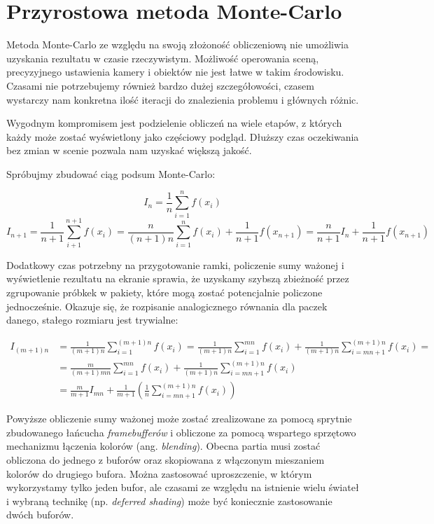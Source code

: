 \documentclass[../main.tex]{subfiles}
\begin{document}
\section{Przyrostowa metoda Monte-Carlo}

Metoda Monte-Carlo ze względu na swoją złożoność obliczeniową nie umożliwia
uzyskania rezultatu w czasie rzeczywistym. Możliwość operowania sceną,
precyzyjnego ustawienia kamery i obiektów nie jest łatwe w takim środowisku.
Czasami nie potrzebujemy również bardzo dużej szczegółowości, czasem wystarczy
nam konkretna ilość iteracji do znalezienia problemu i głównych różnic.

Wygodnym kompromisem jest podzielenie obliczeń na wiele etapów, z których każdy
może zostać wyświetlony jako częściowy podgląd. Dłuższy czas oczekiwania bez
zmian w scenie pozwala nam uzyskać większą jakość.

Spróbujmy zbudować ciąg podsum Monte-Carlo:

\[ I_n = \frac{1}{n} \sum_{i=1}^{n} f(x_i) \]
\[
  I_{n+1} = \frac{1}{n+1} \sum_{i+1}^{n+1}f(x_i)
    = \frac{n}{(n+1)n} \sum_{i=1}^{n}f(x_i) + \frac{1}{n+1}f(x_{n+1})
    = \frac{n}{n+1} I_{n} + \frac{1}{n+1}f(x_{n+1})
\]

Dodatkowy czas potrzebny na przygotowanie ramki, policzenie sumy ważonej i
wyświetlenie rezultatu na ekranie sprawia, że uzyskamy szybszą zbieżność przez
zgrupowanie próbkek w pakiety, które mogą zostać potencjalnie policzone
jednocześnie. Okazuje się, że rozpisanie analogicznego równania dla paczek
danego, stałego rozmiaru jest trywialne:

\begin{align*}
  I_{(m+1)n} &= \frac{1}{(m+1)n} \sum_{i=1}^{(m+1)n} f(x_i)
  = \frac{1}{(m+1)n} \sum_{i=1}^{mn} f(x_i)
    + \frac{1}{(m+1)n} \sum_{i=mn+1}^{(m+1)n} f(x_i) = \\
  &= \frac{m}{(m+1)mn} \sum_{i=1}^{mn} f(x_i)
    + \frac{1}{(m+1)n} \sum_{i=mn+1}^{(m+1)n} f(x_i) \\
  &= \frac{m}{m+1}I_{mn}
    + \frac{1}{m+1} \left(
        \frac{1}{n} \sum_{i=mn+1}^{(m+1)n} f(x_i)
    \right)
\end{align*}

Powyższe obliczenie sumy ważonej może zostać zrealizowane za pomocą sprytnie
zbudowanego łańcucha \textit{framebufferów} i obliczone za pomocą wspartego
sprzętowo mechanizmu łączenia kolorów (ang. \textit{blending}). Obecna partia
musi zostać obliczona do jednego z buforów oraz skopiowana z włączonym
mieszaniem kolorów do drugiego bufora. Można zastosować uproszczenie, w którym
wykorzystamy tylko jeden bufor, ale czasami ze względu na istnienie wielu
świateł i wybraną technikę (np. \textit{deferred shading}) może być koniecznie
zastosowanie dwóch buforów.
\end{document}

